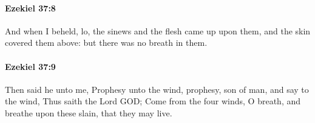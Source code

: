 		\paragraph{Ezekiel 37:8} %
			\label{EZEKIEL-37-8}

			And when I beheld, lo, the sinews and the flesh came up upon them, and the skin covered them above: but there was no breath in them.


		\paragraph{Ezekiel 37:9} %
			\label{EZEKIEL-37-9}

			Then said he unto me, Prophesy unto the wind, prophesy, son of man, and say to the wind, Thus saith the Lord GOD; Come from the four winds, O breath, and breathe upon these slain, that they may live.


